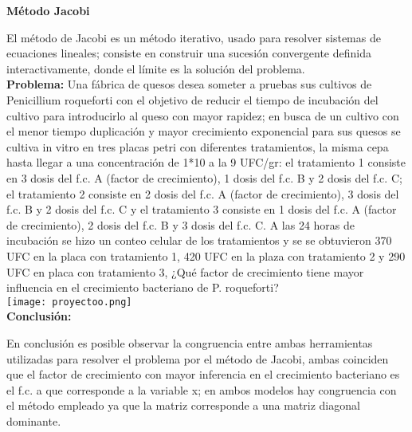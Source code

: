 \documentclass[12pt,a4paper]{article}
\begin{document}
\textbf{Método Jacobi}

El método de Jacobi es un método iterativo, usado para resolver sistemas de ecuaciones lineales; consiste en construir una sucesión convergente definida interactivamente, donde el límite es la solución del problema.\\  

\textbf{Problema:} Una fábrica de quesos desea someter a pruebas sus cultivos de Penicillium roqueforti con el objetivo de reducir el tiempo de incubación del cultivo para introducirlo al queso con mayor rapidez; en busca de un cultivo con el menor tiempo duplicación y mayor crecimiento exponencial para sus quesos se cultiva in vitro  en tres placas petri con diferentes tratamientos, la misma cepa hasta llegar a una concentración de 1*10 a la 9 UFC/gr: el tratamiento 1 consiste en 3 dosis del f.c. A (factor de crecimiento), 1 dosis del f.c. B y 2 dosis del f.c. C; el tratamiento 2 consiste en 2 dosis del f.c. A (factor de crecimiento), 3 dosis del f.c. B y 2 dosis del f.c. C y el tratamiento 3 consiste en 1 dosis del f.c. A (factor de crecimiento), 2 dosis del f.c. B y 3 dosis del f.c. C. A las 24 horas de incubación se hizo un conteo celular de los tratamientos y se se obtuvieron  370 UFC en la placa con tratamiento 1, 420 UFC en la plaza con tratamiento 2 y 290 UFC en placa con tratamiento 3, ¿Qué factor de crecimiento tiene mayor influencia en el crecimiento bacteriano de P. roqueforti?\\
\texttt{[image: proyectoo.png]}\\

\textbf{Conclusión:}

En conclusión es posible observar la congruencia entre ambas herramientas utilizadas para resolver el problema por el método de Jacobi, ambas coinciden que el factor de crecimiento con mayor inferencia en el crecimiento bacteriano es el f.c. a que corresponde a la variable x; en ambos modelos hay congruencia con el método empleado ya que la matriz corresponde a una matriz diagonal dominante.\\ 
\end{document}
